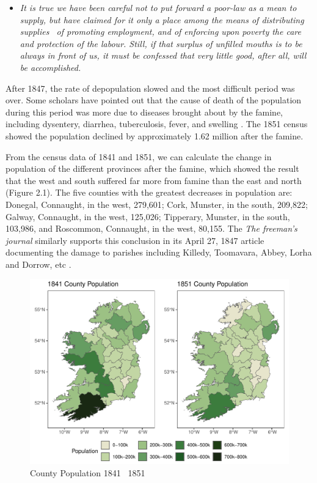 \begin{itemize}
    \item [] \textit{It is true we have been careful not to put forward a poor-law as a mean to supply, but have claimed for it only a place among the means of distributing supplies \textendash\ of promoting employment, and of enforcing upon poverty the care and protection of the labour. Still, if that surplus of unfilled mouths is to be always in front of us, it must be confessed that very little good, after all, will be accomplished.} \citep{thomas1847poorlaw}
\end{itemize}

After 1847, the rate of depopulation slowed and the most difficult period was over. Some scholars have pointed out that the cause of death of the population during this period was more due to diseases brought about by the famine, including dysentery, diarrhea, tuberculosis, fever, and swelling \citep{mokyr2002people}. The 1851 census showed the population declined by approximately 1.62 million after the famine.

From the census data of 1841 and 1851, we can calculate the change in population of the different provinces after the famine, which showed the result that the west and south suffered far more from famine than the east and north  (Figure 2.1). The five counties with the greatest decreases in population are: Donegal, Connaught, in the west, 279,601; Cork, Munster, in the south, 209,822; Galway, Connaught, in the west, 125,026; Tipperary, Munster, in the south, 103,986, and 
Roscommon, Connaught, in the west, 80,155. The \textit{The freeman's journal} similarly supports this conclusion in its April 27, 1847 article documenting the damage to parishes including Killedy, Toomavara, Abbey, Lorha and Dorrow, etc \citep{freeman1847parishes}.

\begin{figure}[htbp]
    \centering
    \caption{County Population 1841 \textendash\ 1851}
    \includegraphics[width=\textwidth]{../03_outputs/map1841_1851.pdf}
\end{figure}

